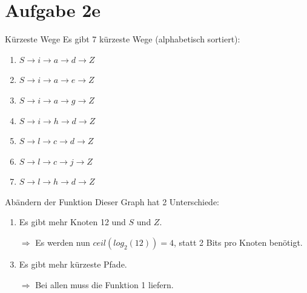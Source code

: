 \documentclass[fleqn,compress,utf8,aspectratio=169,t]{beamer}
\begin{document}
\section{Aufgabe 2e}

\begin{frame}{Kürzeste Wege}
Es gibt 7 kürzeste Wege (alphabetisch sortiert):
\begin{enumerate}
	\item $S \rightarrow i \rightarrow a \rightarrow d \rightarrow Z$
	\item $S \rightarrow i \rightarrow a \rightarrow e \rightarrow Z$
	\item $S \rightarrow i \rightarrow a \rightarrow g \rightarrow Z$
	\item $S \rightarrow i \rightarrow h \rightarrow d \rightarrow Z$
	\item $S \rightarrow l \rightarrow c \rightarrow d \rightarrow Z$
	\item $S \rightarrow l \rightarrow c \rightarrow j \rightarrow Z$
	\item $S \rightarrow l \rightarrow h \rightarrow d \rightarrow Z$
\end{enumerate}
\end{frame}

\begin{frame}{Abändern der Funktion}
Dieser Graph hat 2 Unterschiede:
\begin{enumerate}
	\item Es gibt mehr Knoten 12 und $S$ und $Z$.
	\item[$\Rightarrow$] Es werden nun $ceil(log_2(12)) = 4$, statt 2 Bits pro Knoten benötigt.
	\item Es gibt mehr kürzeste Pfade.
	\item[$\Rightarrow$] Bei allen muss die Funktion 1 liefern.
\end{enumerate}
\end{frame}
\end{document}
